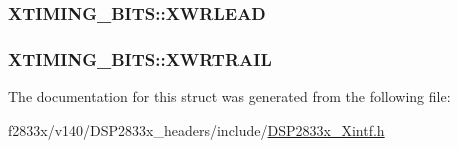 \subsubsection[{X\+W\+R\+L\+E\+A\+D}]{ X\+T\+I\+M\+I\+N\+G\+\_\+\+B\+I\+T\+S\+::\+X\+W\+R\+L\+E\+A\+D}\label{struct_x_t_i_m_i_n_g___b_i_t_s_a6c6c7def2ffe2bf0b1ac1848e2c8fab4}
\hypertarget{struct_x_t_i_m_i_n_g___b_i_t_s_a5caf499f9738f7b50ac2c6dadcf6763a}{}
\subsubsection[{X\+W\+R\+T\+R\+A\+I\+L}]{ X\+T\+I\+M\+I\+N\+G\+\_\+\+B\+I\+T\+S\+::\+X\+W\+R\+T\+R\+A\+I\+L}\label{struct_x_t_i_m_i_n_g___b_i_t_s_a5caf499f9738f7b50ac2c6dadcf6763a}


The documentation for this struct was generated from the following file\+:\begin{DoxyCompactItemize}
\item 
f2833x/v140/\+D\+S\+P2833x\+\_\+headers/include/\hyperlink{_d_s_p2833x___xintf_8h}{D\+S\+P2833x\+\_\+\+Xintf.\+h}\end{DoxyCompactItemize}

